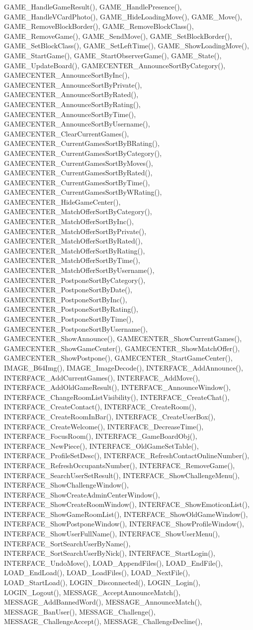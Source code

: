 GAME\_\-HandleGameResult(), GAME\_\-HandlePresence(), GAME\_\-HandleVCardPhoto(), GAME\_\-HideLoadingMove(), GAME\_\-Move(), GAME\_\-RemoveBlockBorder(), GAME\_\-RemoveBlockClass(), GAME\_\-RemoveGame(), GAME\_\-SendMove(), GAME\_\-SetBlockBorder(), GAME\_\-SetBlockClass(), GAME\_\-SetLeftTime(), GAME\_\-ShowLoadingMove(), GAME\_\-StartGame(), GAME\_\-StartObserverGame(), GAME\_\-State(), GAME\_\-UpdateBoard(), GAMECENTER\_\-AnnounceSortByCategory(), GAMECENTER\_\-AnnounceSortByInc(), GAMECENTER\_\-AnnounceSortByPrivate(), GAMECENTER\_\-AnnounceSortByRated(), GAMECENTER\_\-AnnounceSortByRating(), GAMECENTER\_\-AnnounceSortByTime(), GAMECENTER\_\-AnnounceSortByUsername(), GAMECENTER\_\-ClearCurrentGames(), GAMECENTER\_\-CurrentGamesSortByBRating(), GAMECENTER\_\-CurrentGamesSortByCategory(), GAMECENTER\_\-CurrentGamesSortByMoves(), GAMECENTER\_\-CurrentGamesSortByRated(), GAMECENTER\_\-CurrentGamesSortByTime(), GAMECENTER\_\-CurrentGamesSortByWRating(), GAMECENTER\_\-HideGameCenter(), GAMECENTER\_\-MatchOfferSortByCategory(), GAMECENTER\_\-MatchOfferSortByInc(), GAMECENTER\_\-MatchOfferSortByPrivate(), GAMECENTER\_\-MatchOfferSortByRated(), GAMECENTER\_\-MatchOfferSortByRating(), GAMECENTER\_\-MatchOfferSortByTime(), GAMECENTER\_\-MatchOfferSortByUsername(), GAMECENTER\_\-PostponeSortByCategory(), GAMECENTER\_\-PostponeSortByDate(), GAMECENTER\_\-PostponeSortByInc(), GAMECENTER\_\-PostponeSortByRating(), GAMECENTER\_\-PostponeSortByTime(), GAMECENTER\_\-PostponeSortByUsername(), GAMECENTER\_\-ShowAnnounce(), GAMECENTER\_\-ShowCurrentGames(), GAMECENTER\_\-ShowGameCenter(), GAMECENTER\_\-ShowMatchOffer(), GAMECENTER\_\-ShowPostpone(), GAMECENTER\_\-StartGameCenter(), IMAGE\_\-B64Img(), IMAGE\_\-ImageDecode(), INTERFACE\_\-AddAnnounce(), INTERFACE\_\-AddCurrentGames(), INTERFACE\_\-AddMove(), INTERFACE\_\-AddOldGameResult(), INTERFACE\_\-AnnounceWindow(), INTERFACE\_\-ChangeRoomListVisibility(), INTERFACE\_\-CreateChat(), INTERFACE\_\-CreateContact(), INTERFACE\_\-CreateRoom(), INTERFACE\_\-CreateRoomInBar(), INTERFACE\_\-CreateUserBox(), INTERFACE\_\-CreateWelcome(), INTERFACE\_\-DecreaseTime(), INTERFACE\_\-FocusRoom(), INTERFACE\_\-GameBoardObj(), INTERFACE\_\-NewPiece(), INTERFACE\_\-OldGameSetTable(), INTERFACE\_\-ProfileSetDesc(), INTERFACE\_\-RefreshContactOnlineNumber(), INTERFACE\_\-RefreshOccupantsNumber(), INTERFACE\_\-RemoveGame(), INTERFACE\_\-SearchUserSetResult(), INTERFACE\_\-ShowChallengeMenu(), INTERFACE\_\-ShowChallengeWindow(), INTERFACE\_\-ShowCreateAdminCenterWindow(), INTERFACE\_\-ShowCreateRoomWindow(), INTERFACE\_\-ShowEmoticonList(), INTERFACE\_\-ShowGameRoomList(), INTERFACE\_\-ShowOldGameWindow(), INTERFACE\_\-ShowPostponeWindow(), INTERFACE\_\-ShowProfileWindow(), INTERFACE\_\-ShowUserFullName(), INTERFACE\_\-ShowUserMenu(), INTERFACE\_\-SortSearchUserByName(), INTERFACE\_\-SortSearchUserByNick(), INTERFACE\_\-StartLogin(), INTERFACE\_\-UndoMove(), LOAD\_\-AppendFiles(), LOAD\_\-EndFile(), LOAD\_\-EndLoad(), LOAD\_\-LoadFiles(), LOAD\_\-NextFile(), LOAD\_\-StartLoad(), LOGIN\_\-Disconnected(), LOGIN\_\-Login(), LOGIN\_\-Logout(), MESSAGE\_\-AcceptAnnounceMatch(), MESSAGE\_\-AddBannedWord(), MESSAGE\_\-AnnounceMatch(), MESSAGE\_\-BanUser(), MESSAGE\_\-Challenge(), MESSAGE\_\-ChallengeAccept(), MESSAGE\_\-ChallengeDecline(), 